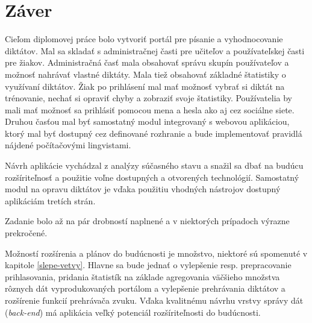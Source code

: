 \documentclass[12pt,oneside]{fithesis2}
\begin{document}
\chapter{Záver}   
       \par Cieľom diplomovej práce bolo vytvoriť portál pre písanie a vyhodnocovanie diktátov. Mal sa skladať s administračnej časti pre učiteľov a používateľskej časti pre žiakov. Administračná časť mala obsahovať správu skupín používateľov a možnosť nahrávať vlastné diktáty. Mala tiež obsahovať základné štatistiky o využívaní diktátov. Žiak po prihlásení mal mať možnosť vybrať si diktát na trénovanie, nechať si opraviť chyby a zobraziť svoje štatistiky. Používatelia by mali mať možnosť sa prihlásiť pomocou mena a hesla ako aj cez sociálne siete.
Druhou časťou mal byť samostatný modul integrovaný s webovou aplikáciou, ktorý mal byť dostupný cez definované rozhranie a bude implementovať pravidlá nájdené počítačovými lingvistami.
		\par Návrh aplikácie vychádzal z analýzy súčasného stavu a snažil sa dbať na budúcu rozšíriteľnosť a použitie voľne dostupných a otvorených technológií. Samostatný modul na opravu diktátov je vďaka použitiu vhodných nástrojov dostupný aplikáciám tretích strán.
		\par Zadanie bolo až na pár drobností naplnené a v niektorých prípadoch výrazne prekročené.
		\par Možností rozšírenia a plánov do budúcnosti je množstvo, niektoré sú spomenuté v kapitole \ref{slepe-vetvy}. Hlavne sa bude jednať o vylepšenie resp. prepracovanie prihlasovania, pridania štatistík na základe agregovania väčšieho množstva rôznych dát vyprodukovaných portálom a vylepšenie prehrávania diktátov a rozšírenie funkcií prehrávača zvuku. Vďaka kvalitnému návrhu vrstvy správy dát (\textit{back-end}) má aplikácia veľký potenciál rozšíriteľnosti do budúcnosti.
       
\end{document}
